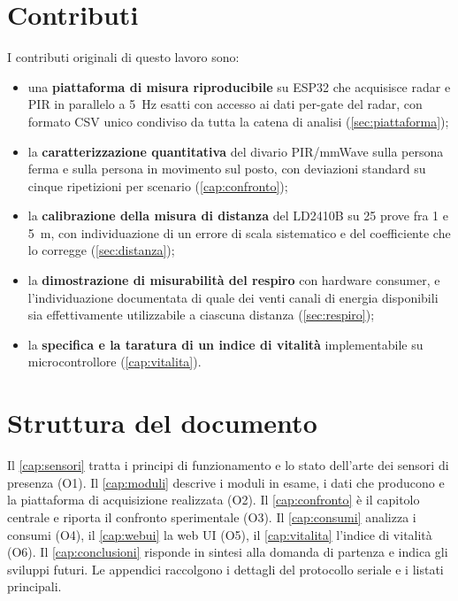 \section{Contributi}
\label{sec:contributi}

I contributi originali di questo lavoro sono:

\begin{itemize}[leftmargin=1.4em,itemsep=3pt]
  \item una \textbf{piattaforma di misura riproducibile} su ESP32 che acquisisce
        radar e PIR in parallelo a 5~Hz esatti con accesso ai dati per-gate del
        radar, con formato CSV unico condiviso da tutta la catena di analisi
        (\cref{sec:piattaforma});
  \item la \textbf{caratterizzazione quantitativa} del divario PIR/mmWave sulla
        persona ferma e sulla persona in movimento sul posto, con deviazioni
        standard su cinque ripetizioni per scenario (\cref{cap:confronto});
  \item la \textbf{calibrazione della misura di distanza} del LD2410B su 25 prove
        fra 1 e 5~m, con individuazione di un errore di scala sistematico e del
        coefficiente che lo corregge (\cref{sec:distanza});
  \item la \textbf{dimostrazione di misurabilità del respiro} con hardware
        consumer, e l'individuazione documentata di quale dei venti canali di
        energia disponibili sia effettivamente utilizzabile a ciascuna distanza
        (\cref{sec:respiro});
  \item la \textbf{specifica e la taratura di un indice di vitalità}
        implementabile su microcontrollore (\cref{cap:vitalita}).
\end{itemize}

\section{Struttura del documento}

Il \cref{cap:sensori} tratta i principi di funzionamento e lo stato dell'arte dei
sensori di presenza (O1). Il \cref{cap:moduli} descrive i moduli in esame, i dati
che producono e la piattaforma di acquisizione realizzata (O2). Il
\cref{cap:confronto} è il capitolo centrale e riporta il confronto sperimentale
(O3). Il \cref{cap:consumi} analizza i consumi (O4), il \cref{cap:webui} la web UI
(O5), il \cref{cap:vitalita} l'indice di vitalità (O6). Il
\cref{cap:conclusioni} risponde in sintesi alla domanda di partenza e indica gli
sviluppi futuri. Le appendici raccolgono i dettagli del protocollo seriale e i
listati principali.
